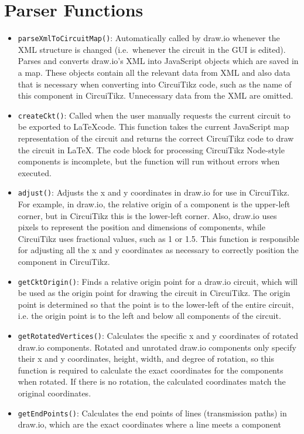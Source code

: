 \section{Parser Functions}\label{sec:parser-funcs}
\begin{itemize}
    \item \texttt{parseXmlToCircuitMap()}: Automatically called by draw.io whenever the XML structure is changed (i.e.\ whenever the circuit in the GUI is edited).
        Parses and converts draw.io's XML into JavaScript objects which are saved in a map.
        These objects contain all the relevant data from XML and also data that is necessary when converting into CircuiTikz code, such as the name of this component in CircuiTikz.
        Unnecessary data from the XML are omitted.
    \item \texttt{createCkt()}: Called when the user manually requests the current circuit to be exported to \LaTeX code.
        This function takes the current JavaScript map representation of the circuit and returns the correct CircuiTikz code to draw the circuit in \LaTeX.
        The code block for processing CircuiTikz Node-style components is incomplete, but the function will run without errors when executed.
    \item \texttt{adjust()}: Adjusts the x and y coordinates in draw.io for use in CircuiTikz.
        For example, in draw.io, the relative origin of a component is the upper-left corner, but in CircuiTikz this is the lower-left corner.
        Also, draw.io uses pixels to represent the position and dimensions of components, while CircuiTikz uses fractional values, such as 1 or 1.5.
        This function is responsible for adjusting all the x and y coordinates as necessary to correctly position the component in CircuiTikz.
    \item \texttt{getCktOrigin()}: Finds a relative origin point for a draw.io circuit, which will be used as the origin point for drawing the circuit in CircuiTikz.
        The origin point is determined so that the point is to the lower-left of the entire circuit, i.e. the origin point is to the left and below all components of the circuit.
    \item \texttt{getRotatedVertices()}: Calculates the specific x and y coordinates of rotated draw.io components.
        Rotated and unrotated draw.io components only specify their x and y coordinates, height, width, and degree of rotation, so this function is required to calculate the exact coordinates for the components when rotated.
        If there is no rotation, the calculated coordinates match the original coordinates.
    \item \texttt{getEndPoints()}: Calculates the end points of lines (transmission paths) in draw.io, which are the exact coordinates where a line meets a component
\end{itemize}


